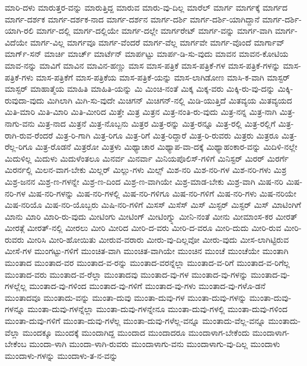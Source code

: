 {ಮಾರಿ-ದಳು
ಮಾರುತ್ತರ-ವನ್ನು
ಮಾರುತ್ತಿದ್ದ
ಮಾರುವ
ಮಾರು-ವು-ದಿಲ್ಲ
ಮಾರೆಲ್
ಮಾರ್ಗ
ಮಾರ್ಗಕ್ಕೆ
ಮಾರ್ಗದ
ಮಾರ್ಗ-ದರ್ಶಕ
ಮಾರ್ಗ-ದರ್ಶಕ-ನಾದ
ಮಾರ್ಗ-ದರ್ಶನ
ಮಾರ್ಗ-ದರ್ಶಿ
ಮಾರ್ಗ-ದರ್ಶಿ-ಯಾಗಿದ್ದಾನೆ
ಮಾರ್ಗ-ದರ್ಶಿ-ಯಾಗಿ-ರಲಿ
ಮಾರ್ಗ-ದಲ್ಲಿ
ಮಾರ್ಗ-ದಲ್ಲಿಯೇ
ಮಾರ್ಗ-ದಲ್ಲೇ
ಮಾರ್ಗರೇಟ್
ಮಾರ್ಗ-ವನ್ನು
ಮಾರ್ಗ-ವಾಗಿ
ಮಾರ್ಗ-ವಿದೆಯೇ
ಮಾರ್ಗ-ವಿಲ್ಲ
ಮಾರ್ಗವೂ
ಮಾರ್ಗ-ವೆಂದರೆ
ಮಾರ್ಗ-ವೆಲ್ಲ
ಮಾರ್ಗವೇ
ಮಾರ್ಗ-ವೊಂದೆ
ಮಾರ್ಗಾವ್
ಮಾರ್ಗ್-ಸನ್
ಮಾರ್ಚಿ
ಮಾರ್ಚ್
ಮಾರ್ಟೆನ್
ಮಾರ್ಪಟ್ಟು
ಮಾರ್ಪ-ಡಿ-ಸು-ವುದು
ಮಾವನ
ಮಾವನ-ಕೋಟಿಯ
ಮಾವ-ನನ್ನು
ಮಾವಿಗೆ
ಮಾವಿನ
ಮಾವಿನ-ಹಣ್ಣು
ಮಾಸ
ಮಾಸ-ಪತ್ರಿಕೆ
ಮಾಸ-ಪತ್ರಿಕೆ-ಗಳ
ಮಾಸ-ಪತ್ರಿಕೆ-ಗಳನ್ನು
ಮಾಸ-ಪತ್ರಿಕೆ-ಗಳು
ಮಾಸ-ಪತ್ರಿಕೆಗೆ
ಮಾಸ-ಪತ್ರಿಕೆಯ
ಮಾಸ-ಪತ್ರಿಕೆ-ಯನ್ನು
ಮಾಸ-ಲಾಗಿಡೋಣ
ಮಾಸಿ-ಕ-ವಾಗಿ
ಮಾಸ್ಟರ್
ಮಾಸ್ಟರ್
ಮಾಹಾತ್ಮೆಯ
ಮಾಹಿತಿ
ಮಾಹಿತಿ-ಯನ್ನು
ಮಿ
ಮಿಂಚಿ-ನಂತೆ
ಮಿಕ್ಕ
ಮಿಕ್ಕ-ವರು
ಮಿಕ್ಕಿ-ರು-ವು-ದನ್ನು
ಮಿಕ್ಕಿ-ರುವುದಾ-ವುದು
ಮಿಗಿಲಾಗಿ
ಮಿಗಿ-ಸು-ವುದೇ
ಮಿಚಿಗನ್
ಮಿಚಿಗನ್-ನಲ್ಲಿ
ಮಿಡಿ-ಯುತ್ತಿದೆ
ಮಿತವ್ಯಯ
ಮಿತವ್ಯಯದ
ಮಿತಿ-ಮಾರಿ
ಮಿತಿ-ಮಿಾರಿ
ಮಿತಿ-ಮೀರಿದ
ಮಿತ್ತೇ
ಮಿತ್ರ
ಮಿತ್ರನ
ಮಿತ್ರ-ನಂತಿ-ರು-ವುದು
ಮಿತ್ರ-ನನ್ನ
ಮಿತ್ರ-ನಾಗಿ
ಮಿತ್ರ-ನಾಗು-ವನು
ಮಿತ್ರ-ನಾದ
ಮಿತ್ರನೆ
ಮಿತ್ರ-ನೊಬ್ಬನು
ಮಿತ್ರರ
ಮಿತ್ರ-ರನ್ನು
ಮಿತ್ರ-ರನ್ನೂ
ಮಿತ್ರ-ರಲ್ಲಿ
ಮಿತ್ರ-ರಲ್ಲಿಗೆ
ಮಿತ್ರ-ರಾಗಿ-ರುವ-ರೆಂದರೆ
ಮಿತ್ರ-ರಿ-ಗಾಗಿ
ಮಿತ್ರ-ರಿಗೂ
ಮಿತ್ರ-ರಿಗೆ
ಮಿತ್ರ-ರಿದ್ದಾರೆ
ಮಿತ್ರ-ರಿ-ರುವರು
ಮಿತ್ರರು
ಮಿತ್ರರೂ
ಮಿತ್ರ-ರೆಲ್ಲ-ರಿಗೂ
ಮಿತ್ರ-ರೊಡನೆ
ಮಿತ್ರರೋ
ಮಿತ್ರಳು
ಮಿಥ್ಯಾಚಾರ
ಮಿಥ್ಯಾಪ-ವಾ-ದಕ್ಕೆ
ಮಿಥ್ಯಾಹಂಕಾರ-ವನ್ನು
ಮಿದಿಳಿ-ನಲ್ಲೇ
ಮಿದುಳಿಲ್ಲ
ಮಿದುಳು
ಮಿದುಳೆಂತಲೂ
ಮಿನರ್ವ
ಮಿನರ್ವಾ
ಮಿನಿಯಪೊಲಿಸ್-ಗಳಿಗೆ
ಮಿನಿಸ್ಟರ್
ಮಿರರ್
ಮಿರರ್ಗೆ
ಮಿರರ್ನಲ್ಲಿ
ಮಿಲನ-ವಾಗ-ಬೇಕು
ಮಿಲ್ಲರ್
ಮಿಲ್ಲು-ಗಳು
ಮಿಲ್ಸ್
ಮಿಶ-ನರಿ
ಮಿಶ-ನರಿ-ಗಳ
ಮಿಶ-ನರಿ-ಗಳು
ಮಿಶ್ರ
ಮಿಶ್ರ-ಜನನ
ಮಿಶ್ರ-ಣ-ಗಳನ್ನೇ
ಮಿಶ್ರ-ಣ-ದಿಂದ
ಮಿಶ್ರ-ಣ-ವಾಗಿಯೇ
ಮಿಶ್ರ-ಮಾಡ-ಬೇಕು
ಮಿಶ್ರ-ವಾಗಿ
ಮಿಷ-ನರಿ
ಮಿಷ-ನರಿ-ಗಳ
ಮಿಷ-ನರಿ-ಗಳನ್ನು
ಮಿಷ-ನರಿ-ಗಳಲ್ಲಿ
ಮಿಷ-ನರಿ-ಗಳಿಗೂ
ಮಿಷ-ನರಿ-ಗಳಿಗೆ
ಮಿಷ-ನರಿ-ಗಳು
ಮಿಷ-ನರಿಯೇ
ಮಿಷ-ನರಿಯೊ
ಮಿಷ-ನರಿ-ಯೊಬ್ಬರು
ಮಿಷಿ-ನರಿ-ಗಳಿಗೆ
ಮಿಸಸ್
ಮಿಸೆಸ್
ಮಿಸ್
ಮಿಸ್ಟರ್
ಮಿಸ್ಟರ್
ಮಿಸ್
ಮಿಾಟಿಂಗಿಗೆ
ಮಿಾನು
ಮಿಾರಿ
ಮಿಾರಿ-ರು-ವುದು
ಮೀಟಿಂಗು
ಮೀಟಿಂಗ್
ಮೀಟಿಂಗ್ನ್ನು
ಮೀನಿ-ನಂತೆ
ಮೀನು
ಮೀಮಾಂಸ-ಕರ
ಮೀರತ್
ಮೀರತ್ಗೆ
ಮೀರತ್-ನಲ್ಲಿ
ಮೀರಲು
ಮೀರಿ
ಮೀರಿದ
ಮೀರಿ-ದ-ವರು
ಮೀರಿ-ದ-ವರೂ
ಮೀರಿ-ದುದು
ಮೀರಿ-ರುವ
ಮೀರಿ-ರುವರು
ಮೀರಿಸಿ
ಮೀರಿ-ಹೋಯಿತು
ಮೀರುವ-ವರಾರು
ಮೀರು-ವು-ದಿಲ್ಲವೋ
ಮೀರು-ವುದು
ಮೀಸ-ಲಾಗಿಟ್ಟಿರುವ
ಮೀಸೆ-ಗಳ
ಮುಂಗಟ್ಟು-ಗಳಿಗೆ
ಮುಂಚಿತ-ವಾಗಿ
ಮುಂಚಿತ-ವಾಗಿಯೇ
ಮುಂಚಿನ
ಮುಂಚೆ
ಮುಂಚೆಯೇ
ಮುಂತಾಗಿ
ಮುಂತಾದ
ಮುಂತಾದ-ವರ
ಮುಂತಾದ-ವ-ರನ್ನು
ಮುಂತಾದ-ವರನ್ನೆಲ್ಲಾ
ಮುಂತಾದ-ವ-ರಿಗೆ
ಮುಂತಾದ-ವ-ರಿಗೆಲ್ಲ
ಮುಂತಾದ-ವರು
ಮುಂತಾದ-ವ-ರೆಲ್ಲಾ
ಮುಂತಾದವು
ಮುಂತಾದ-ವು-ಗಳ
ಮುಂತಾದ-ವು-ಗಳನ್ನು
ಮುಂತಾದ-ವು-ಗಳಲ್ಲೆಲ್ಲ
ಮುಂತಾದ-ವು-ಗಳಿಂದ
ಮುಂತಾದ-ವು-ಗಳಿಗೆ
ಮುಂತಾದ-ವು-ಗಳು
ಮುಂತಾದ-ವು-ಗಳೊ-ಡನೆ
ಮುಂತಾದವೂ
ಮುಂತಾದು-ವನ್ನು
ಮುಂತಾ-ದುವು
ಮುಂತಾ-ದುವು-ಗಳ
ಮುಂತಾ-ದುವು-ಗಳನ್ನು
ಮುಂತಾ-ದುವು-ಗಳನ್ನೂ
ಮುಂತಾ-ದುವು-ಗಳನ್ನೆಲ್ಲಾ
ಮುಂತಾ-ದುವು-ಗಳನ್ನೇನೂ
ಮುಂತಾ-ದುವು-ಗಳಲ್ಲಿ
ಮುಂತಾ-ದುವು-ಗಳಿಂದ
ಮುಂತಾ-ದುವು-ಗಳಿಗೆ
ಮುಂತಾ-ದುವು-ಗಳೆಲ್ಲ
ಮುಂತಾ-ದುವು-ಗಳೆಲ್ಲ-ವನ್ನೂ
ಮುಂತಾದು-ವೆಲ್ಲ-ವನ್ನೂ
ಮುಂತಾದು-ವೆಲ್ಲಾ
ಮುಂದಕ್ಕೂ
ಮುಂದಕ್ಕೆ
ಮುಂದಾಗಿದ್ದ
ಮುಂದಾದ
ಮುಂದಾದರೂ
ಮುಂದಾಳಾಗ-ಬೇಕೆಂದು
ಮುಂದಾಳಾಗ-ಬೇಕೆಂಬ
ಮುಂದಾ-ಳಾಗಿ
ಮುಂದಾ-ಳಾಗಿ-ರುವರು
ಮುಂದಾಳಾಗು-ವನು
ಮುಂದಾಳಾಗು-ವು-ದಿಲ್ಲ
ಮುಂದಾಳು
ಮುಂದಾಳು-ಗಳನ್ನು
ಮುಂದಾಳು-ತ-ನ-ವನ್ನು
}
